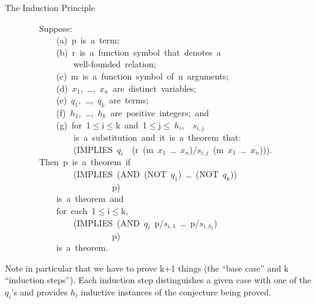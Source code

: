\documentclass[10pt]{book}
\newenvironment{pubasis}{\begin{flushleft}}{\end{flushleft}}
\begin{document}
\hrulefill 

\begin{center}
The Induction Principle
\end{center}
\begin{pubasis}
~~~~~~~~Suppose:\\

~~~~~~~~~~~~(a)~p~is~a~term;\\
~~~~~~~~~~~~(b)~r~is~a~function~symbol~that~denotes~a\\
~~~~~~~~~~~~~~~~well-founded~relation;\\
~~~~~~~~~~~~(c)~m~is~a~function~symbol~of~n~arguments;\\
~~~~~~~~~~~~(d)~$x_{1}$,~\ldots{},~$x_{n}$~are~distinct~variables;\\
~~~~~~~~~~~~(e)~$q_{1}$,~\ldots{},~$q_{k}$~are~terms;\\
~~~~~~~~~~~~(f)~$h_{1}$,~\ldots{},~$h_{k}$~are~positive~integers;~and\\
~~~~~~~~~~~~(g)~for~1$\leq$i$\leq$k~and~1$\leq$j$\leq~h_{i}$,~~$s_{i,j}$\\
~~~~~~~~~~~~~~~~is~a~substitution~and~it~is~a~theorem~that:\\

~~~~~~~~~~~~~~~~(IMPLIES~$q_{i}$~~(r~(m~$x_{1}$~\ldots{}~$x_{n}$)/$s_{i,j}$~(m~$x_{1}$~\ldots{}~$x_{n}$))).\\

~~~~~~~~Then~p~is~a~theorem~if\\

~~~~~~~~~~~~~~~~(IMPLIES~(AND~(NOT~$q_{1}$)~\ldots{}~(NOT~$q_{k}$))\\
~~~~~~~~~~~~~~~~~~~~~~~~~p)\\

~~~~~~~~~~~~is~a~theorem~and\\

~~~~~~~~~~~~for~each~1$\leq$i$\leq$k,\\

~~~~~~~~~~~~~~~~(IMPLIES~(AND~$q_{i}$~p/$s_{i,1}$~\ldots{}~p/$s_{i,h_{i}}$)\\
~~~~~~~~~~~~~~~~~~~~~~~~~p)\\

~~~~~~~~~~~~is~a~theorem.\\
\end{pubasis}

\hrulefill 

Note in particular that we have to prove k+1 things (the ``base case'' and k
``induction steps'').  Each induction step distinguishes a given case with
one of the $q_{i}$'s and provides $h_{i}$ inductive instances of the conjecture
being proved.
\end{document}
